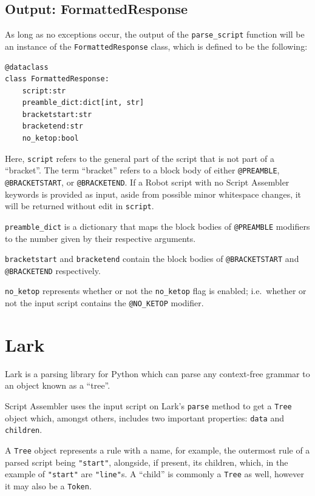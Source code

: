 \subsection{Output: FormattedResponse}

As long as no exceptions occur, the output of the \verb|parse_script| function will be an instance of the \verb|FormattedResponse| class, which is defined to be the following:

\begin{lstlisting}
@dataclass
class FormattedResponse:
    script:str
    preamble_dict:dict[int, str]
    bracketstart:str
    bracketend:str
    no_ketop:bool 
\end{lstlisting}

Here, \verb|script| refers to the general part of the script that is not part of a ``bracket''. The term ``bracket'' refers to a block body of either \verb|@PREAMBLE|, \verb|@BRACKETSTART|, or \verb|@BRACKETEND|. If a Robot script with no Script Assembler keywords is provided as input, aside from possible minor whitespace changes, it will be returned without edit in \verb|script|. 

\verb|preamble_dict| is a dictionary that maps the block bodies of \verb|@PREAMBLE| modifiers to the number given by their respective arguments. 

\verb|bracketstart| and \verb|bracketend| contain the block bodies of \verb|@BRACKETSTART| and \verb|@BRACKETEND| respectively. 

\verb|no_ketop| represents whether or not the \verb|no_ketop| flag is enabled; i.e.\ whether or not the input script contains the \verb|@NO_KETOP| modifier.

\section{Lark}

Lark is a parsing library for Python which can parse any context-free grammar to an object known as a ``tree''.\cite{py-module-lark}

Script Assembler uses the input script on Lark's \verb|parse| method to get a \verb|Tree| object which, amongst others, includes two important properties: \verb|data| and \verb|children|.

A \verb|Tree| object represents a rule with a name, for example, the outermost rule of a parsed script being \verb|"start"|, alongside, if present, its children, which, in the example of \verb|"start"| are \verb|"line"|s. A ``child'' is commonly a \verb|Tree| as well, however it may also be a \verb|Token|. 

